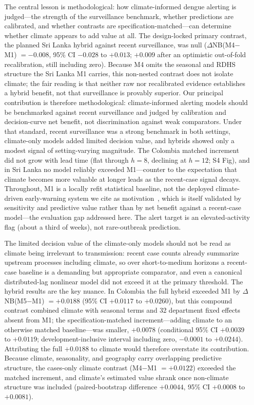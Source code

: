 \documentclass[11pt,a4paper]{article}
\begin{document}
The central lesson is methodological: how climate-informed dengue alerting is judged---the strength of the surveillance benchmark, whether predictions are calibrated, and whether contrasts are specification-matched---can determine whether climate appears to add value at all. The design-locked primary contrast, the planned Sri Lanka hybrid against recent surveillance, was null ($\Delta$NB(M4$-$M1) $=-0.008$, 95\% CI $-0.028$ to $+0.013$; $+0.009$ after an optimistic out-of-fold recalibration, still including zero). Because M4 omits the seasonal and RDHS structure the Sri Lanka M1 carries, this non-nested contrast does not isolate climate; the fair reading is that neither raw nor recalibrated evidence establishes a hybrid benefit, not that surveillance is provably superior. Our principal contribution is therefore methodological: climate-informed alerting models should be benchmarked against recent surveillance and judged by calibration and decision-curve net benefit, not discrimination against weak comparators. Under that standard, recent surveillance was a strong benchmark in both settings, climate-only models added limited decision value, and hybrids showed only a modest signal of setting-varying magnitude. The Colombia matched increment did not grow with lead time (flat through $h=8$, declining at $h=12$; S4 Fig), and in Sri Lanka no model reliably exceeded M1---counter to the expectation that climate becomes more valuable at longer leads as the recent-case signal decays. Throughout, M1 is a locally refit statistical baseline, not the deployed climate-driven early-warning system we cite as motivation~\cite{EWARScsd}, which is itself validated by sensitivity and predictive value rather than by net benefit against a recent-case model---the evaluation gap addressed here. The alert target is an elevated-activity flag (about a third of weeks), not rare-outbreak prediction.

The limited decision value of the climate-only models should not be read as climate being irrelevant to transmission: recent case counts already summarize upstream processes including climate, so over short-to-medium horizons a recent-case baseline is a demanding but appropriate comparator, and even a canonical distributed-lag nonlinear model did not exceed it at the primary threshold. The hybrid results are the key nuance. In Colombia the full hybrid exceeded M1 by $\Delta$NB(M5$-$M1) $=+0.0188$ (95\% CI $+0.0117$ to $+0.0260$), but this compound contrast combined climate with seasonal terms and 32 department fixed effects absent from M1; the specification-matched increment---adding climate to an otherwise matched baseline---was smaller, $+0.0078$ (conditional 95\% CI $+0.0039$ to $+0.0119$; development-inclusive interval including zero, $-0.0001$ to $+0.0244$). Attributing the full $+0.0188$ to climate would therefore overstate its contribution. Because climate, seasonality, and geography carry overlapping predictive structure, the cases-only climate contrast (M4$-$M1 $=+0.0122$) exceeded the matched increment, and climate's estimated value shrank once non-climate structure was included (paired-bootstrap difference $+0.0044$, 95\% CI $+0.0008$ to $+0.0081$).
\end{document}
